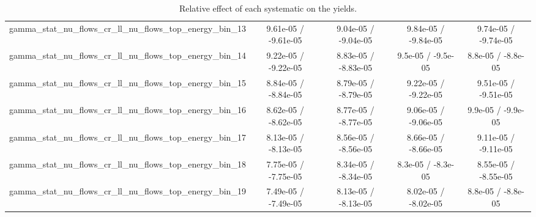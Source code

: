 \documentclass[10pt]{article}
\begin{document}
\begin{table}[htbp]
\begin{center}
\begin{tabular}{|c|c|c|c|c|}
  gamma_stat_nu_flows_cr_ll_nu_flows_top_energy_bin_13 & 9.61e-05 / -9.61e-05 & 9.04e-05 / -9.04e-05 & 9.84e-05 / -9.84e-05 & 9.74e-05 / -9.74e-05 \\ 
  gamma_stat_nu_flows_cr_ll_nu_flows_top_energy_bin_14 & 9.22e-05 / -9.22e-05 & 8.83e-05 / -8.83e-05 & 9.5e-05 / -9.5e-05 & 8.8e-05 / -8.8e-05 \\ 
  gamma_stat_nu_flows_cr_ll_nu_flows_top_energy_bin_15 & 8.84e-05 / -8.84e-05 & 8.79e-05 / -8.79e-05 & 9.22e-05 / -9.22e-05 & 9.51e-05 / -9.51e-05 \\ 
  gamma_stat_nu_flows_cr_ll_nu_flows_top_energy_bin_16 & 8.62e-05 / -8.62e-05 & 8.77e-05 / -8.77e-05 & 9.06e-05 / -9.06e-05 & 9.9e-05 / -9.9e-05 \\ 
  gamma_stat_nu_flows_cr_ll_nu_flows_top_energy_bin_17 & 8.13e-05 / -8.13e-05 & 8.56e-05 / -8.56e-05 & 8.66e-05 / -8.66e-05 & 9.11e-05 / -9.11e-05 \\ 
  gamma_stat_nu_flows_cr_ll_nu_flows_top_energy_bin_18 & 7.75e-05 / -7.75e-05 & 8.34e-05 / -8.34e-05 & 8.3e-05 / -8.3e-05 & 8.55e-05 / -8.55e-05 \\ 
  gamma_stat_nu_flows_cr_ll_nu_flows_top_energy_bin_19 & 7.49e-05 / -7.49e-05 & 8.13e-05 / -8.13e-05 & 8.02e-05 / -8.02e-05 & 8.8e-05 / -8.8e-05 \\ 
\hline 
\end{tabular} 
\caption{Relative effect of each systematic on the yields.} 
\end{center} 
\end{table} 
\end{document}
